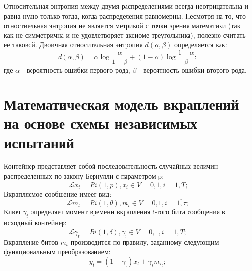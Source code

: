 ﻿\documentclass[a4paper,12pt]{article}
\theoremstyle{plain}
\begin{document}
Относительная энтропия между двумя распределениями всегда неотрицательна и равна нулю только тогда, когда распределения равномерны. Несмотря на то, что отностиельная энтропия не является метрикой с точки зрения математики (так как не симметрична и не удовлетворяет аксиоме треугольника), полезно считать ее таковой. Двоичная относительная энтропия $d(\alpha, \beta)$ определяется как:
	\begin{equation}
	d(\alpha, \beta) = \alpha \log \frac{\alpha}{1-\beta} + (1-\alpha)\log \frac{1-\alpha}{\beta};
	\end{equation}
где $\alpha$  - вероятность ошибки первого рода, $\beta$  - вероятность ошибки второго рода.

\newpage
\section{Математическая модель вкраплений на основе схемы независимых испытаний}

\vspace*{1cm}
Контейнер представляет собой последовательность случайных величин распределенных по закону Бернулли с параметром p:
\begin{equation}\label{container:eq}\
	\mathcal{L}{x_t} = Bi(1, p), x_i \in V = {0, 1}, i = \overline{1,T};
\end{equation}
Вкрапляемое сообщение имеет вид:
\begin{equation}
	\mathcal{L}{m_t} = Bi(1, \theta), m_i \in V = {0, 1}, i = \overline{1,\tau};
\end{equation}
Ключ $\gamma_t$ определяет момент времени вкрапления i-того бита сообщения в исходный контейнер:
\begin{equation}
	\mathcal{L}{\gamma_t} = Bi(1, \delta), \gamma_i \in V = {0, 1}, i = \overline{1,T};
\end{equation}
Вкрапление битов ${m_t}$ производится по правилу, заданному следующим функциональным преобразованием:
\begin{equation}\label{input:rule}
	y_t=(1-\gamma_t)x_t+\gamma_t m_{\tau_t};
\end{equation}
\end{document}
